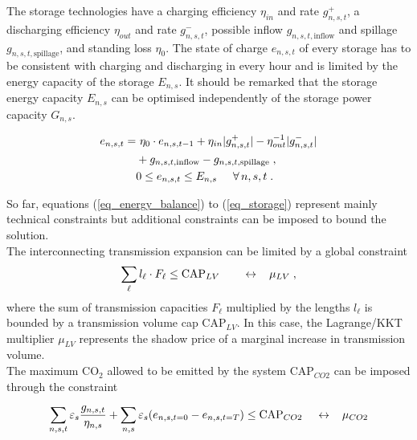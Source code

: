 \documentclass[3p]{elsarticle} %
\begin{document}
The storage technologies have a charging efficiency $\eta_{in}$ and rate $g_{n,s,t}^+$, a discharging efficiency $\eta_{out}$ and rate $g_{n,s,t}^-$, possible inflow $g_{n,s,t,\textrm{inflow}}$ and spillage $g_{n,s,t,\textrm{spillage}}$, and standing loss $\eta_0$. The state of charge $e_{n,s,t}$ of every storage has to be consistent with charging and discharging in every hour and is limited by the energy capacity of the storage $E_{n,s}$. It should be remarked that the storage energy capacity $E_{n,s}$ can be optimised independently of the storage power capacity $G_{n,s}$.

\begin{align}
e_{n,s,t} = & \ \eta_0 \cdot e_{n,s,t-1} + \eta_{in} |g_{n,s,t}^+| - \eta_{out}^{-1} |g_{n,s,t}^-| \nonumber \\
& + g_{n,s,t,\textrm{inflow}} - g_{n,s,t,\textrm{spillage}} \; , \nonumber \\
& 0  \leq   e_{n,s,t} \leq E_{n,s}   \hspace{0.5cm} \forall\, n,s,t \; . \label{eq_storage}
\end{align}

So far, equations (\ref{eq_energy_balance}) to (\ref{eq_storage}) represent mainly technical constraints but additional constraints can be imposed to bound the solution.\\

The interconnecting transmission expansion can be limited by a global constraint
\begin{equation}
\sum_{\ell} l_\ell \cdot F_{\ell} \leq  \textrm{CAP}_{LV} \hspace{.7cm} \leftrightarrow \hspace{0.3cm} \mu_{LV} \; ,
\label{eq_cap}
\end{equation}
where the sum of transmission capacities $F_{\ell}$ multiplied by the lengths $l_{\ell}$ is bounded by a transmission volume cap $\textrm{CAP}_{LV}$. In this case, the Lagrange/KKT multiplier $\mu_{LV}$ represents the shadow price of a marginal increase in transmission volume.\\


The maximum CO$_2$ allowed to be emitted by the system $\textrm{CAP}_{CO2}$ can be imposed through the constraint 

\begin{equation}
  \sum_{n,s,t}  \varepsilon_{s} \frac{ g_{n,s,t} }{\eta_{n,s}} + \sum_{n,s} \varepsilon_{s} (e_{n,s,t=0} - e_{n,s,t=T})  \leq  \textrm{CAP}_{CO2} \hspace{.4cm} \leftrightarrow \hspace{0.3cm} \mu_{CO2} \label{eq_co2cap}
\end{equation}
\end{document}
